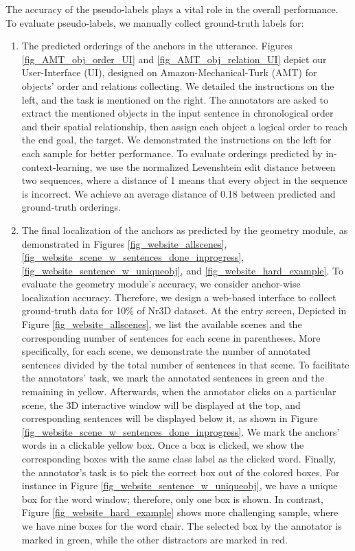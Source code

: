 The accuracy of the pseudo-labels plays a vital role in the overall performance. 
To evaluate pseudo-labels, we manually collect ground-truth labels for:
\begin{enumerate}
  \item The predicted orderings of the anchors in the utterance.
    Figures \ref{fig_AMT_obj_order_UI} and \ref{fig_AMT_obj_relation_UI} depict our User-Interface (UI), designed on Amazon-Mechanical-Turk (AMT) \citep{amt} for objects' order and relations collecting. We detailed the instructions on the left, and the task is mentioned on the right. The annotators are asked to extract the mentioned objects in the input sentence in chronological order and their spatial relationship, then assign each object a logical order to reach the end goal, the target. We demonstrated the instructions on the left for each sample for better performance.
    To evaluate orderings predicted by in-context-learning, we use the normalized Levenshtein edit distance between two sequences, where a distance of 1 means that every object in the sequence is incorrect. We achieve an average distance of 0.18 between predicted and ground-truth orderings.
  \item The final localization of the anchors as predicted by the geometry module, as demonstrated in Figures \ref{fig_website_allscenes}, \ref{fig_website_scene_w_sentences_done_inprogress}, \ref{fig_website_sentence_w_uniqueobj}, and \ref{fig_website_hard_example}.
    To evaluate the geometry module’s accuracy, we consider anchor-wise localization accuracy. Therefore, we design a web-based interface to collect ground-truth data for 10\% of Nr3D dataset.
    At the entry screen, Depicted in Figure \ref{fig_website_allscenes}, we list the available scenes and the corresponding number of sentences for each scene in parentheses. More specifically, for each scene, we demonstrate the number of annotated sentences divided by the total number of sentences in that scene. To facilitate the annotators' task, we mark the annotated sentences in green and the remaining in yellow.
    Afterwards, when the annotator clicks on a particular scene, the 3D interactive window will be displayed at the top, and corresponding sentences will be displayed below it, as shown in Figure \ref{fig_website_scene_w_sentences_done_inprogress}.
    We mark the anchors' words in a clickable yellow box. Once a box is clicked, we show the corresponding boxes with the same class label as the clicked word. Finally, the annotator's task is to pick the correct box out of the colored boxes. 
    For instance in Figure \ref{fig_website_sentence_w_uniqueobj}, we have a unique box for the word window; therefore, only one box is shown.
    In contrast, Figure \ref{fig_website_hard_example} shows more challenging sample, where we have nine boxes for the word chair. The selected box by the annotator is marked in green, while the other distractors are marked in red.

\end{enumerate}

